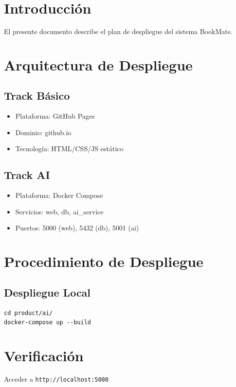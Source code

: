 
\def\docTitle{Plan de Despliegue}
\def\docSubtitle{Estrategia de Despliegue con Docker}
\def\docWeek{16}
\def\docVersion{1.0}





\makeUNIcover
\versionTable
\tableofcontents
\newpage

\section{Introducción}

El presente documento describe el plan de despliegue del sistema BookMate.

\section{Arquitectura de Despliegue}

\subsection{Track Básico}
\begin{itemize}
    \item Plataforma: GitHub Pages
    \item Dominio: github.io
    \item Tecnología: HTML/CSS/JS estático
\end{itemize}

\subsection{Track AI}
\begin{itemize}
    \item Plataforma: Docker Compose
    \item Servicios: web, db, ai\_service
    \item Puertos: 5000 (web), 5432 (db), 5001 (ai)
\end{itemize}

\section{Procedimiento de Despliegue}

\subsection{Despliegue Local}

\begin{verbatim}
cd product/ai/
docker-compose up --build
\end{verbatim}

\section{Verificación}

Acceder a \texttt{http://localhost:5000}

\printbibliography[heading=bibintoc,title={Referencias}]



